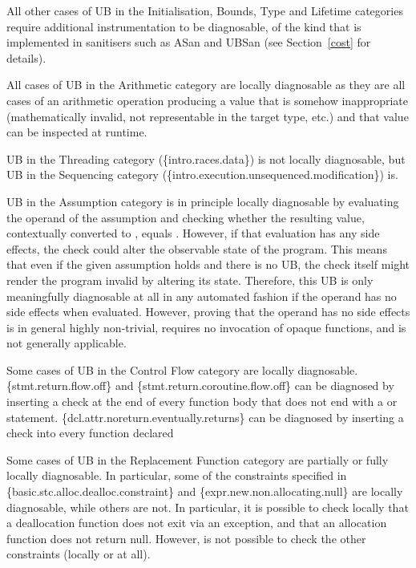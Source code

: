 All other cases of UB in the Initialisation, Bounds, Type and Lifetime categories require additional instrumentation to be diagnosable, of the kind that is implemented in sanitisers such as ASan and UBSan (see Section~\ref{cost} for details).

All cases of UB in the Arithmetic category are locally diagnosable as they are all cases of an arithmetic operation producing a value that is somehow inappropriate (mathematically invalid, not representable in the target type, etc.) and that value can be inspected at runtime.

UB in the Threading category (\{intro.races.data\}) is not locally diagnosable, but UB in the Sequencing category (\{intro.execution.unsequenced.modification\}) is. 

UB in the Assumption category is in principle locally diagnosable by evaluating the operand of the assumption and checking whether the resulting value, contextually converted to , equals . However, if that evaluation has any side effects, the check could alter the observable state of the program. This means that even if the given assumption holds and there is no UB, the check itself might render the program invalid by altering its state. Therefore, this UB is only meaningfully diagnosable at all in any automated fashion if the operand has no side effects when evaluated. However, proving that the operand has no side effects is in general highly non-trivial, requires no invocation of opaque functions, and is not generally applicable.  

Some cases of UB in the Control Flow category are locally diagnosable. \{stmt.return.flow.off\} and \{stmt.return.coroutine.flow.off\} can be diagnosed by inserting a check at the end of every function body that does not end with a  or  statement. \{dcl.attr.noreturn.eventually.returns\} can be diagnosed by inserting a check into every function declared \tcode{[[noreturn]]}

Some cases of UB in the Replacement Function category are partially or fully locally diagnosable. In particular, some of the constraints specified in \{basic.stc.alloc.dealloc.constraint\} and \{expr.new.non.allocating.null\} are locally diagnosable, while others are not. In particular, it is possible to check locally that a deallocation function does not exit via an exception, and that an allocation function does not return null. However, is not possible to check the other constraints (locally or at all).

